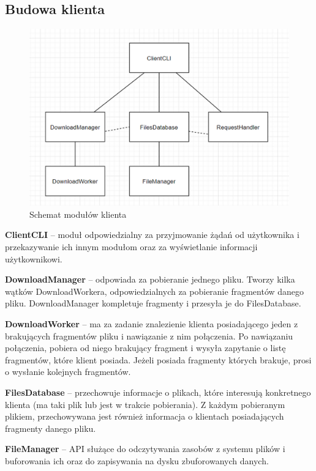 \documentclass[11pt]{article}
\begin{document}
\subsection{Budowa klienta}
\begin{figure}[h]
\caption{Schemat modułów klienta}
\centering
\includegraphics[scale=0.4]{1}
\end{figure}

\textbf{ClientCLI} -- moduł odpowiedzialny za przyjmowanie żądań od użytkownika i przekazywanie ich innym modułom oraz za wyświetlanie informacji użytkownikowi.

\textbf{DownloadManager} -- odpowiada za pobieranie jednego pliku. Tworzy kilka wątków DownloadWorkera, odpowiedzialnych za pobieranie fragmentów danego pliku. DownloadManager kompletuje fragmenty i przesyła je do FilesDatabase.

\textbf{DownloadWorker} -- ma za zadanie znalezienie klienta posiadającego jeden z brakujących fragmentów pliku i nawiązanie z nim połączenia. Po nawiązaniu połączenia, pobiera od niego brakujący fragment i wysyła zapytanie o listę fragmentów, które klient posiada. Jeżeli posiada fragmenty których brakuje, prosi o wysłanie kolejnych fragmentów. 

\textbf{FilesDatabase} -- przechowuje informacje o plikach, które interesują konkretnego klienta (ma taki plik lub jest w trakcie pobierania). Z każdym pobieranym plikiem, przechowywana jest również informacja o klientach posiadających fragmenty danego pliku.

\textbf{FileManager} -- API służące do odczytywania zasobów z systemu plików i buforowania ich oraz do zapisywania na dysku zbuforowanych danych.
\end{document}
